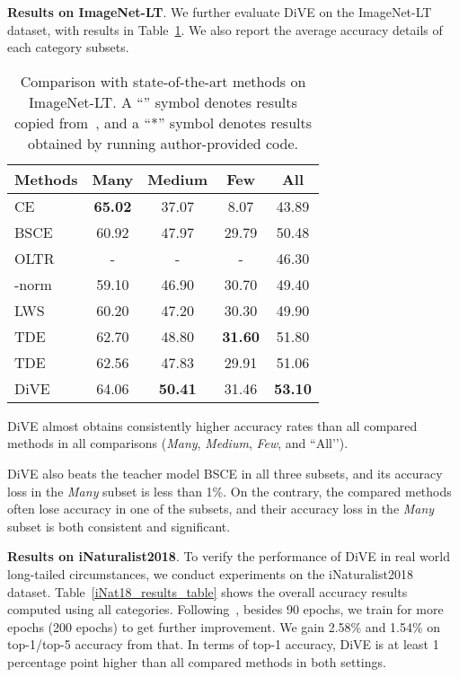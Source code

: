 \documentclass[10pt,twocolumn,letterpaper]{article}
\begin{document}
\textbf{Results on ImageNet-LT}.
We further evaluate DiVE on the ImageNet-LT dataset, with results in Table~\ref{ImageNet_LT_results_table}. We also report the average accuracy details of each category subsets.

\begin{table}
   \caption{Comparison with state-of-the-art methods on ImageNet-LT. A ``\dag'' symbol denotes results copied from~\cite{kang2019decoupling}, and a ``*'' symbol denotes results obtained by running author-provided code.}
   \centering
   \small
      \begin{tabular}{l|cccc}
      \hline
      Methods & Many & Medium & Few & All \\
      \hline \hline
      CE & \textbf{65.02} & 37.07 & \phantom{0}8.07 & 43.89\\
      BSCE & 60.92 & 47.97 & 29.79 & 50.48 \\
      \hline
      OLTR~\cite{liu2019openlongtailrecognition} & - & - & - & 46.30 \\
-norm~\cite{kang2019decoupling} & 59.10 & 46.90 & 30.70 & 49.40\\
      LWS~\cite{kang2019decoupling} & 60.20 & 47.20 & 30.30 & 49.90\\
      TDE~\cite{tang2020longtailed} & 62.70 & 48.80 & \textbf{31.60} & 51.80 \\
      TDE & 62.56 & 47.83 & 29.91 & 51.06 \\
      \hline
      DiVE & 64.06 & \textbf{50.41} & 31.46 & \textbf{53.10} \\
      \hline
      \end{tabular}
   \label{ImageNet_LT_results_table}
\end{table}

DiVE almost obtains consistently higher accuracy rates than all compared methods in all comparisons (\emph{Many}, \emph{Medium}, \emph{Few}, and ``All’’). 

DiVE also beats the teacher model BSCE in all three subsets, and its accuracy loss in the \emph{Many} subset is less than 1\%. On the contrary, the compared methods often lose accuracy in one of the subsets, and their accuracy loss in the \emph{Many} subset is both consistent and significant.

\textbf{Results on iNaturalist2018}.
To verify the performance of DiVE in real world long-tailed circumstances, we conduct experiments on the  iNaturalist2018 dataset. Table~\ref{iNat18_results_table} shows the overall accuracy results computed using all categories. Following~\cite{kang2019decoupling}, besides 90 epochs, we train for more epochs (200 epochs) to get further improvement. We gain 2.58\% and 1.54\% on top-1/top-5 accuracy from that. In terms of top-1 accuracy, DiVE is at least 1 percentage point higher than all compared methods in both settings.
\end{document}
